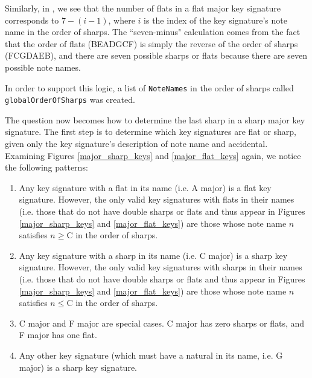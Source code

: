 \documentclass{report}
\begin{document}
Similarly, in , we see that the number of flats in a flat major key signature corresponds to $7-(i-1)$, where $i$ is the index of the key signature's note name in the order of sharps. The ``seven-minus" calculation comes from the fact that the order of flats (BEADGCF) is simply the reverse of the order of sharps (FCGDAEB), and there are seven possible sharps or flats because there are seven possible note names. 

In order to support this logic, a list of \verb.NoteNames. in the order of sharps called \verb.globalOrderOfSharps. was created.

The question now becomes how to determine the last sharp in a sharp major key signature. The first step is to determine which key signatures are flat or sharp, given only the key signature's description of note name and accidental. Examining Figures \ref{major_sharp_keys} and \ref{major_flat_keys} again, we notice the following patterns:
\begin{enumerate}
\item  Any key  signature with a flat in its name (i.e. A\musFlat \; major) is a flat key signature. However, the only valid key signatures with flats in their names (i.e. those that do not have double sharps or flats and thus appear in Figures \ref{major_sharp_keys} and \ref{major_flat_keys}) are those whose note name $n$ satisfies $n \geq $\;C in the order of sharps.
\item  Any key  signature with a sharp in its name (i.e. C\musSharp \; major) is a sharp key signature. However, the only valid key signatures with sharps in their names (i.e. those that do not have double sharps or flats and thus appear in Figures \ref{major_sharp_keys} and \ref{major_flat_keys}) are those whose note name $n$ satisfies $n \leq $\;C in the order of sharps.
\item  C major and F major are special cases. C major has zero sharps or flats, and F  major has one flat.
\item  Any other key signature (which must have a natural in its name, i.e. G major) is a sharp key signature.
\end{enumerate}
\end{document}
